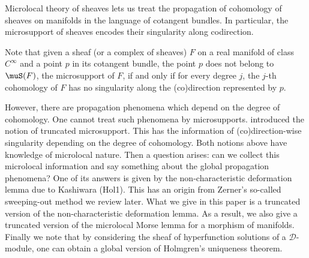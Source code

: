 


Microlocal theory of sheaves lets us treat 
the propagation of cohomology of sheaves on manifolds 
in the language of cotangent bundles. 
In particular, the microsupport of sheaves encodes 
their singularity along codirection. 

Note that given a sheaf (or a complex of sheaves) \(F\) 
on a real manifold of class \(C^\infty\) and a point \(p\) 
in its cotangent bundle, the point \(p\) does not belong 
to \(\muS(F)\), the microsupport of \(F\), 
if and only if for every degree \(j\), the \(j\)-th cohomology 
of \(F\) has no singularity along the (co)direction 
represented by \(p\). 

However, 
there are propagation phenomena which depend on 
the degree of cohomology. 
One cannot treat such phenomena by microsupports. 
\cite{KMS03a} introduced the notion of truncated microsupport. 
This has the information of (co)direction-wise 
singularity depending on the degree of cohomology. 
Both notions above have knowledge of microlocal nature. 
Then a question arises: can we collect this microlocal 
information and say something about 
the global propagation phenomena? 
One of its answers is given by the non-characteristic 
deformation lemma due to Kashiwara (Hol1). 
This has an origin from Zerner's so-called sweeping-out method 
we review later. 
What we give in this paper is a truncated version 
of the non-characteristic deformation lemma. 
As a result, we also give a truncated version of 
the microlocal Morse lemma for a morphism of manifolds. 
Finally we note that by considering the sheaf of hyperfunction 
solutions of a \(\mathcal{D}\)-module, 
one can obtain a global version of 
Holmgren's uniqueness theorem. 


